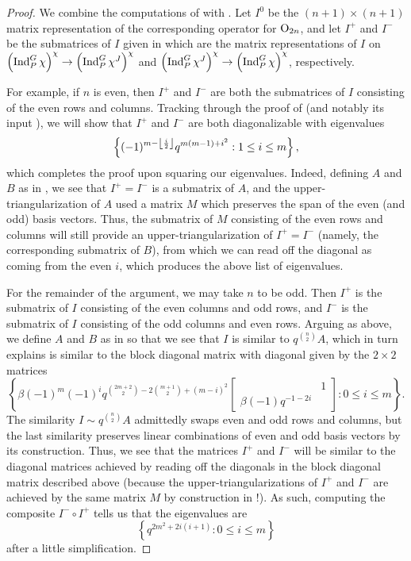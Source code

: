 \begin{proof}
    We combine the computations of  with . Let $I^0$ be the $(n+1)\times(n+1)$ matrix representation of the corresponding operator for $\mathrm{O}_{2n}$, and let $I^+$ and $I^-$ be the submatrices of $I$ given in  which are the matrix representations of $I$ on $\left(\operatorname{Ind}_P^G\chi\right)^\chi\to\left(\operatorname{Ind}_P^G\chi^J\right)^\chi$ and $\left(\operatorname{Ind}_P^G\chi^J\right)^\chi\to\left(\operatorname{Ind}_P^G\chi\right)^\chi$, respectively.

    For example, if $n$ is even, then $I^+$ and $I^-$ are both the submatrices of $I$ consisting of the even rows and columns. Tracking through the proof of  (and notably its input ), we will show that $I^+$ and $I^-$ are both diagonalizable with eigenvalues
    \[\left\{(-1)^{m-\left\lfloor{\frac i2}\right\rfloor}q^{m(m-1)+i^2}:1\le i\le m\right\},\]
    which completes the proof upon squaring our eigenvalues. Indeed, defining $A$ and $B$ as in , we see that $I^+=I^-$ is a submatrix of $A$, and the upper-triangularization of $A$ used a matrix $M$ which preserves the span of the even (and odd) basis vectors. Thus, the submatrix of $M$ consisting of the even rows and columns will still provide an upper-triangularization of $I^+=I^-$ (namely, the corresponding submatrix of $B$), from which we can read off the diagonal as coming from the even $i$, which produces the above list of eigenvalues.

    For the remainder of the argument, we may take $n$ to be odd. Then $I^+$ is the submatrix of $I$ consisting of the even columns and odd rows, and $I^-$ is the submatrix of $I$ consisting of the odd columns and even rows. Arguing as above, we define $A$ and $B$ as in  so that we see that $I$ is similar to $q^{\binom{n}2}A$, which in turn  explains is similar to the block diagonal matrix with diagonal given by the $2\times2$ matrices
    \[\left\{\beta(-1)^m(-1)^iq^{\binom{2m+2}2-2\binom{m+1}2+(m-i)^2}\begin{bmatrix}
        & 1 \\
        \beta(-1)q^{-1-2i}
    \end{bmatrix}:0\le i\le m\right\}.\]
    The similarity $I\sim q^{\binom{n}2}A$ admittedly swaps even and odd rows and columns, but the last similarity preserves linear combinations of even and odd basis vectors by its construction. Thus, we see that the matrices $I^+$ and $I^-$ will be similar to the diagonal matrices achieved by reading off the diagonals in the block diagonal matrix described above (because the upper-triangularizations of $I^+$ and $I^-$ are achieved by the same matrix $M$ by construction in !). As such, computing the composite $I^-\circ I^+$ tells us that the eigenvalues are
    \[\left\{q^{2m^2+2i(i+1)}:0\le i\le m\right\}\]
    after a little simplification.
\end{proof}

